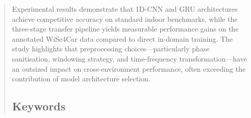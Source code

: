 \documentclass[english,bibtex]{kththesis}
\begin{document}
\begin{abstract}
\begin{scontents}[store-env=abstracts,print-env=true]
Experimental results demonstrate that 1D-CNN and GRU architectures achieve competitive accuracy on standard indoor benchmarks, while the three-stage transfer pipeline yields measurable performance gains on the annotated WiSe4Car data compared to direct in-domain training. The study highlights that preprocessing choices---particularly phase sanitisation, windowing strategy, and time-frequency transformation---have an outsized impact on cross-environment performance, often exceeding the contribution of model architecture selection.
\end{scontents}

\subsection*{Keywords}
\begin{scontents}[store-env=keywords,print-env=true]
\end{scontents}
\end{abstract}

\cleardoublepage
\end{document}
